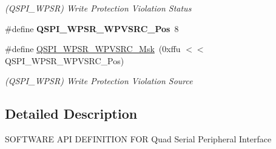 \begin{DoxyCompactItemize}
\begin{DoxyCompactList}\small\item\em (Q\+S\+P\+I\+\_\+\+W\+P\+SR) Write Protection Violation Status \end{DoxyCompactList}\item 
\mbox{\label{group__SAMS70__QSPI_ga3b09542f57db4ff8079f2eb7502fd8ae}} 
\#define {\bfseries Q\+S\+P\+I\+\_\+\+W\+P\+S\+R\+\_\+\+W\+P\+V\+S\+R\+C\+\_\+\+Pos}~8
\item 
\mbox{\label{group__SAMS70__QSPI_gab225658731bd850a2bfa6bd12ecb6cea}} 
\#define \mbox{\hyperlink{group__SAMS70__QSPI_gab225658731bd850a2bfa6bd12ecb6cea}{Q\+S\+P\+I\+\_\+\+W\+P\+S\+R\+\_\+\+W\+P\+V\+S\+R\+C\+\_\+\+Msk}}~(0xffu $<$$<$ Q\+S\+P\+I\+\_\+\+W\+P\+S\+R\+\_\+\+W\+P\+V\+S\+R\+C\+\_\+\+Pos)
\begin{DoxyCompactList}\small\item\em (Q\+S\+P\+I\+\_\+\+W\+P\+SR) Write Protection Violation Source \end{DoxyCompactList}\end{DoxyCompactItemize}


\subsection{Detailed Description}
S\+O\+F\+T\+W\+A\+RE A\+PI D\+E\+F\+I\+N\+I\+T\+I\+ON F\+OR Quad Serial Peripheral Interface 